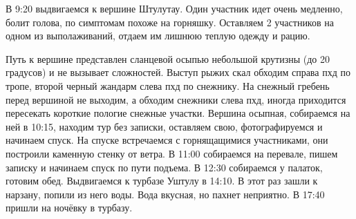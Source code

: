 В 9:20 выдвигаемся к вершине Штулутау. Один участник идет очень медленно, болит голова, по симптомам похоже на горняшку. Оставляем 2 участников на одном из выполаживаний, отдаем им лишнюю теплую одежду и рацию.

Путь к вершине представлен сланцевой осыпью небольшой крутизны (до 20 градусов) и не вызывает сложностей.  Выступ рыжих скал обходим справа пхд по тропе, второй черный жандарм слева пхд по снежнику. На снежный гребень перед вершиной не выходим, а обходим снежники слева пхд, иногда приходится пересекать короткие пологие снежные участки. Вершина осыпная, собираемся на ней в 10:15, находим тур без записки, оставляем свою, фотографируемся и начинаем спуск. На спуске встречаемся с горнящащимися участниками, они построили каменную стенку от ветра. В 11:00 собираемся на перевале, пишем записку и начинаем спуск по пути подъема.
В 12:30 собираемся у палаток, готовим обед. Выдвигаемся к турбазе Уштулу в 14:10. В этот раз зашли к нарзану, попили из него воды. Вода вкусная, но пахнет неприятно. В 17:40 пришли на ночёвку в турбазу.








    \FloatBarrier
